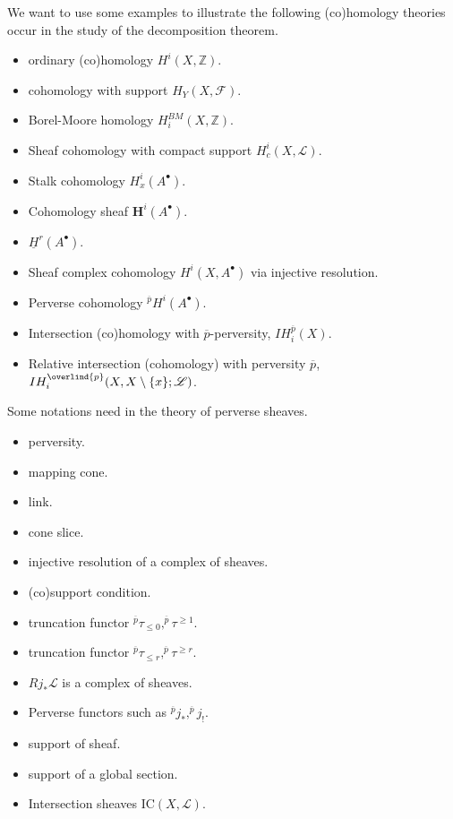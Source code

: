 \documentclass[../main.tex]{subfiles}
\begin{document}
\begin{example}
We want to use some examples to illustrate the following (co)homology theories occur in the study of the decomposition theorem. 
\begin{itemize}
\item ordinary (co)homology $H^{i}(X, \mathbb{Z})$.
\item cohomology with support $H_{Y}(X, \mathscr{F})$.
\item Borel-Moore homology $H_{i}^{BM}(X, \mathbb{Z})$.
\item Sheaf cohomology with compact support $H_{c}^{i}(X, \mathscr{L})$.
\item Stalk cohomology $H_{x}^{i}(A^{\bullet})$.
\item Cohomology sheaf $\mathbf{H}^{i}(A^{\bullet})$.
\item $\underline{H}^{r}(A^{\bullet})$.
\item Sheaf complex cohomology $H^{i}(X, A^{\bullet})$ via injective resolution.
\item Perverse cohomology $^{\overline{p}}H^{i}(A^{\bullet})$.
\item Intersection (co)homology with $\overline{p}$-perversity, $IH_{i}^{\overline{p}}(X)$.
\item Relative intersection (cohomology) with perversity $\overline{p}$, $IH^{\overlind{p}}_{i}(X,X\setminus\{x\};\mathscr{L})$.
\end{itemize}
\end{example}

\begin{example}
Some notations need in the theory of perverse sheaves.
\begin{itemize}
\item perversity.
\item mapping cone.
\item link.
\item cone slice.
\item injective resolution of a complex of sheaves.
\item (co)support condition.
\item truncation functor $^{\overline{p}}\tau_{\leq 0}, ^{\overline{p}}\tau^{\geq 1}$.
\item truncation functor $^{\overline{p}}\tau_{\leq r}, ^{\overline{p}}\tau^{\geq r}$.
\item $Rj_{*}\mathscr{L}$ is a complex of sheaves.
\item Perverse functors such as $^{\overline{p}}j_{*}, ^{\overline{p}}j_{!}$.
\item support of sheaf. 
\item support of a global section.
\item Intersection sheaves $\mathrm{IC}(X, \mathscr{L})$.
\end{itemize}
\end{example}
\end{document}

